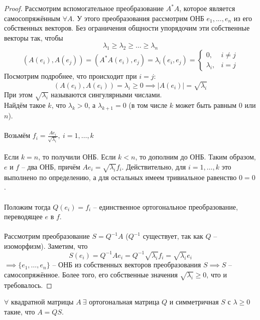\documentclass[11pt]{article}
\begin{document}
\begin{proof}
    Рассмотрим вспомогательное преобразование $A^*A$, которое является 
    самосопряжённым $\forall A$. У этого преобразования рассмотрим ОНБ 
    $e_1,...,e_n$ из его собственных векторов. Без ограничения общности 
    упорядочим эти собственные векторы так, чтобы
    \[\lambda_1 \geq \lambda_2 \geq \ldots \geq \lambda_n\]  
    \[(A(e_i), A(e_j)) = (A^*A(e_i), e_j) = \lambda_i (e_i,e_j) =  
    \begin{cases}
        0, & i \neq j \\
        \lambda_i, & i = j
    \end{cases}\]  
    Посмотрим подробнее, что происходит при $i = j$:
    \[(A(e_i), A(e_i)) = \lambda_i \geq 0 \implies 
    \left\lvert A(e_i) \right\rvert = \sqrt{\lambda_i}\]
    При этом $\sqrt{\lambda_i}$ называются сингулярными числами. \\
    Найдём такое $k$, что $\lambda_k > 0$, а $\lambda_{k + 1} = 0$ (в том 
    числе $k$ может быть равным $0$ или $n$). \\ \\
    Возьмём $f_i = \displaystyle \frac{Ae_i}{\sqrt{\lambda_i}}, \ i = 1, 
    \ldots, k$ \\ \\
    Если $k = n$, то получили ОНБ. Если $k < n$, то дополним до ОНБ. Таким 
    образом, $e$ и $f$ -- два ОНБ, причём $Ae_i = \sqrt{\lambda_i}f_i$. 
    Действительно, для $i = 1, \ldots, k$ это выполнено по определению, а 
    для остальных имеем тривиальное равенство $0 = 0$. \\ \\
    Положим тогда $Q(e_i) = f_i$ -- единственное ортогональное преобразование, 
    переводящее $e$ в $f$. \\ \\
    Рассмотрим преобразование $S = Q^{-1}A$ ($Q^{-1}$ существует, так как 
    $Q$ -- изоморфизм). Заметим, что 
    \[S(e_i) = Q^{-1}Ae_i = Q^{-1}\sqrt{\lambda_i}f_i = \sqrt{\lambda_i}e_i\]
    $\implies \{e_1, \ldots, e_n\}$ -- ОНБ из собственных векторов 
    преобразования $S \implies S$ -- самосопряжённое. Более того, его 
    собственные значения $\sqrt{\lambda_i} \geq 0$, что и требовалось.  
\end{proof}

\begin{theorem}
  $\forall$ квадратной матрицы $A \ \exists$ ортогональная матрица 
  $Q$ и симметричная $S$ с $\lambda \geq 0$ такие, что $A = QS$.
\end{theorem}
\end{document}
